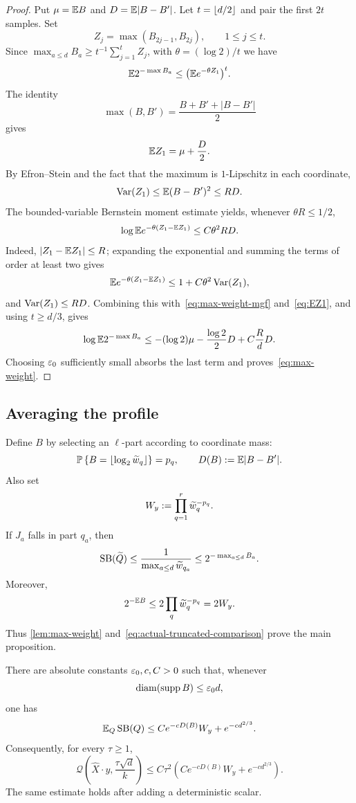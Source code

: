 \begin{proof}
Put $\mu=\mathbb E B$ and $D=\mathbb E|B-B'|$. Let $t=\left\lfloor d/2\right\rfloor$ and pair the first $2t$ samples. Set
\[
  Z_j=\max(B_{2j-1},B_{2j}),
  \qquad1\le j\le t.
\]
Since $\max_{a\le d}B_a\ge t^{-1}\sum_{j=1}^tZ_j$, with $\theta=(\log2)/t$ we have
\begin{equation}\label{eq:max-weight-mgf}
  \mathbb E2^{-\max B_a}\le\bigl(\mathbb E e^{-\theta Z_1}\bigr)^t.
\end{equation}
The identity
\[
  \max(B,B')=\frac{B+B'+|B-B'|}{2}
\]
gives
\begin{equation}\label{eq:EZ1}
  \mathbb E Z_1=\mu+\frac D2.
\end{equation}
By Efron--Stein and the fact that the maximum is $1$-Lipschitz in each coordinate,
\[
  \operatorname{Var}(Z_1)\le\mathbb E(B-B')^2\le RD.
\]
The bounded-variable Bernstein moment estimate yields, whenever $\theta R\le1/2$,
\[
  \log\mathbb E e^{-\theta(Z_1-\mathbb E Z_1)}\le C\theta^2RD.
\]
Indeed, $|Z_1-\mathbb E Z_1|\le R$; expanding the exponential and summing the terms of order at least two gives
\[
  \mathbb E e^{-\theta(Z_1-\mathbb E Z_1)}\le1+C\theta^2\operatorname{Var}(Z_1),
\]
and $\operatorname{Var}(Z_1)\le RD$. Combining this with~\eqref{eq:max-weight-mgf} and~\eqref{eq:EZ1}, and using $t\ge d/3$, gives
\[
  \log\mathbb E2^{-\max B_a}
  \le-(\log2)\mu-\frac{\log2}{2}D+C\frac RdD.
\]
Choosing $\varepsilon_0$ sufficiently small absorbs the last term and proves~\eqref{eq:max-weight}.
\end{proof}

\subsection{Averaging the profile}

Define $B$ by selecting an $\ell$-part according to coordinate mass:
\begin{equation}\label{eq:B-distribution}
  \mathbb P\left\{B=\left\lfloor \log_2\widetilde w_q\right\rfloor\right\}=p_q,
  \qquad
  D(B):=\mathbb E|B-B'|.
\end{equation}
Also set
\begin{equation}\label{eq:Wy}
  W_y:=\prod_{q=1}^r\widetilde w_q^{-p_q}.
\end{equation}
If $J_a$ falls in part $q_a$, then
\[
  \operatorname{SB}(\widetilde Q)
  \le\frac1{\max_{a\le d}\widetilde w_{q_a}}
  \le2^{-\max_{a\le d}B_a}.
\]
Moreover,
\[
  2^{-\mathbb E B}\le2\prod_q\widetilde w_q^{-p_q}=2W_y.
\]
Thus \cref{lem:max-weight} and~\eqref{eq:actual-truncated-comparison} prove the main proposition.

\begin{proposition}\label{prop:averaged-profile}
There are absolute constants $\varepsilon_0,c,C>0$ such that, whenever
\[
  \operatorname{diam}(\operatorname{supp} B)\le\varepsilon_0d,
\]
one has
\begin{equation}\label{eq:averaged-profile}
  \mathbb E_Q\operatorname{SB}(Q)
  \le Ce^{-cD(B)}W_y+e^{-cd^{2/3}}.
\end{equation}
Consequently, for every $\tau\ge1$,
\begin{equation}\label{eq:averaged-profile-small-ball}
  \mathcal Q\!\left(\widehat X\cdot y,\frac{\tau\sqrt d}{k}\right)
  \le C\tau^2\left(Ce^{-cD(B)}W_y+e^{-cd^{2/3}}\right).
\end{equation}
The same estimate holds after adding a deterministic scalar.
\end{proposition}

